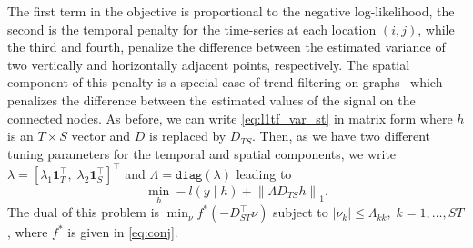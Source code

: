 \documentclass{article}
\newcommand{\attn}[1]{\textcolor{red}{TODO: #1}}
\newcommand{\one}{\mathbf{1}}
\newcommand{\given}{\;\vert\;}
\newcommand{\norm}[1]{\left\lVert #1 \right\rVert}
\begin{document}
The first term in the objective is proportional to the negative
log-likelihood, the second is the temporal penalty for the
time-series at each location $(i,j)$, while the third and fourth,
penalize the difference between the estimated variance of two
vertically and horizontally adjacent points, respectively. The spatial
component of this
penalty is a special case of trend
filtering on graphs~\citep{wang_trend_2016} which penalizes the difference
between the estimated values of the signal on the connected
nodes. As before, we can write
\eqref{eq:l1tf_var_st} in matrix form where $h$ is an $T\times
S$ vector and $D$ is replaced by $D_{TS}$. Then, as we
have two different tuning parameters for the temporal and spatial
components, we write $\lambda =\left[\lambda_1\one_T^\top,\;
  \lambda_2\one_{S}^\top\right]^\top$ and $\Lambda =\texttt{diag}(\lambda)$ leading to 
\begin{equation}
\min_h -l(y\given h)+ \norm{\Lambda D_{TS}h }_1.
\label{eq:l1tf_var_st_mat}
\end{equation}
The dual of this problem is 
$\min_\nu f^*(-D_{ST}^\top\nu)$ subject to 
$| \nu_k | \le \Lambda_{kk},\; k=1,\ldots,ST$,
 where $f^*$ is given in \eqref{eq:conj}.
\end{document}

